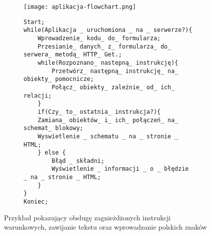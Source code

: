 			\begin{figure}[H]
  \begin{subfigure}{\textwidth}
    \texttt{[image: aplikacja-flowchart.png]}
  \end{subfigure}\hfill
  \begin{subfigure}[t]{0.44\textwidth}
    \begin{verbatim}
Start;
while(Aplikacja _ uruchomiona _ na _ serwerze?){
    Wprowadzenie_ kodu_ do_ formularza;
    Przesianie_ danych_ z_ formularza_ do_ serwera_ metodą_ HTTP_ Get.;
    while(Rozpoznano_ nastepną_ instrukcję){
        Przetwórz_ następną_ instrukcję_ na_ obiekty_ pomocnicze;
        Połącz_ obiekty_ zależnie_ od_ ich_ relacji;
    }
    if(Czy_ to_ ostatnia_ instrukcja?){
    Zamiana_ obiektów_ i_ ich_ połączeń_ na_ schemat_ blokowy;
    Wyswietlenie _ schematu _ na _ stronie _ HTML;
    } else {
        Błąd _ składni;
        Wyświetlenie _ informacji _ o _ błędzie _ na _ stronie _ HTML;
    }
}
Koniec;
    \end{verbatim}
  \end{subfigure}%
  \caption{Przykład pokazujący obsługę zagnieżdżonych instrukcji warunkowych, zawijanie tekstu oraz wprowadzanie polskich znaków}
\end{figure}